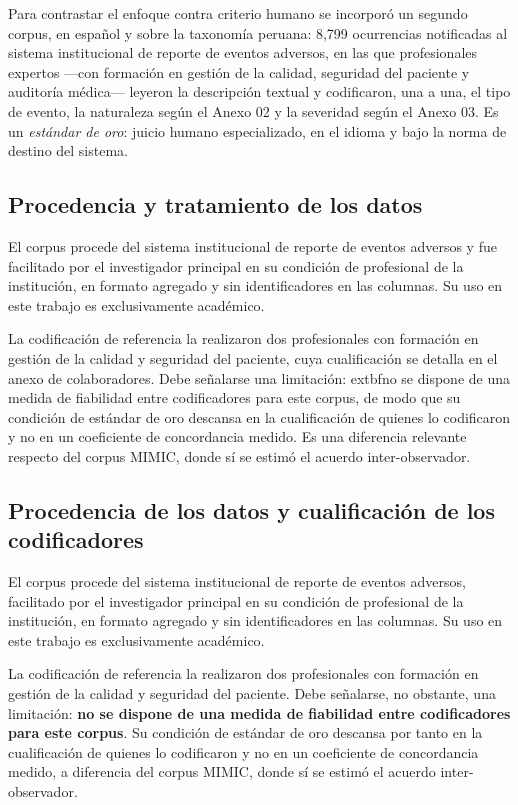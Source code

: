 \documentclass[conference]{IEEEtran}
\begin{document}
Para contrastar el enfoque contra criterio humano se incorporó un segundo
corpus, en español y sobre la taxonomía peruana: 8,799
ocurrencias notificadas al sistema institucional de reporte de eventos
adversos, en las que profesionales expertos ---con formación en gestión de la
calidad, seguridad del paciente y auditoría médica--- leyeron la descripción
textual y codificaron, una a una, el tipo de evento, la naturaleza según el
Anexo 02 y la severidad según el Anexo 03. Es un \emph{estándar de oro}: juicio
humano especializado, en el idioma y bajo la norma de destino del sistema.

\subsection{Procedencia y tratamiento de los datos}
El corpus procede del sistema institucional de reporte de eventos adversos y
fue facilitado por el investigador principal en su condición de profesional de
la institución, en formato agregado y sin identificadores en las columnas. Su
uso en este trabajo es exclusivamente académico.

La codificación de referencia la realizaron dos profesionales con formación en
gestión de la calidad y seguridad del paciente, cuya cualificación se detalla
en el anexo de colaboradores. Debe señalarse una limitación: 	extbf{no se
dispone de una medida de fiabilidad entre codificadores para este corpus}, de
modo que su condición de estándar de oro descansa en la cualificación de
quienes lo codificaron y no en un coeficiente de concordancia medido. Es una
diferencia relevante respecto del corpus MIMIC, donde sí se estimó el acuerdo
inter-observador.

\subsection{Procedencia de los datos y cualificación de los codificadores}
El corpus procede del sistema institucional de reporte de eventos adversos,
facilitado por el investigador principal en su condición de profesional de la
institución, en formato agregado y sin identificadores en las columnas. Su uso
en este trabajo es exclusivamente académico.

La codificación de referencia la realizaron dos profesionales con formación en
gestión de la calidad y seguridad del paciente. Debe señalarse, no obstante,
una limitación: \textbf{no se dispone de una medida de fiabilidad entre
codificadores para este corpus}. Su condición de estándar de oro descansa por
tanto en la cualificación de quienes lo codificaron y no en un coeficiente de
concordancia medido, a diferencia del corpus MIMIC, donde sí se estimó el
acuerdo inter-observador.
\end{document}
